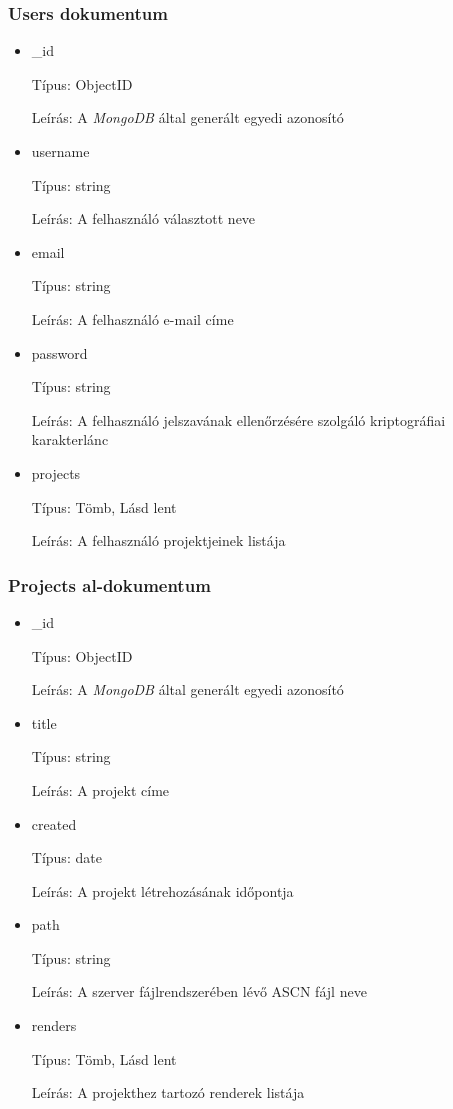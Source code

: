 \subsubsection{Users dokumentum}
\begin{itemize}
    \item \_id

          Típus: ObjectID

          Leírás: A \emph{MongoDB} által generált egyedi azonosító
    \item username

          Típus: string

          Leírás: A felhasználó választott neve
    \item email

          Típus: string

          Leírás: A felhasználó e-mail címe
    \item password

          Típus: string

          Leírás: A felhasználó jelszavának ellenőrzésére szolgáló kriptográfiai karakterlánc
    \item projects

          Típus: Tömb, Lásd lent

          Leírás: A felhasználó projektjeinek listája
\end{itemize}

\subsubsection{Projects al-dokumentum}

\begin{itemize}
    \item \_id

          Típus: ObjectID

          Leírás: A \emph{MongoDB} által generált egyedi azonosító
    \item title

          Típus: string

          Leírás: A projekt címe
    \item created

          Típus: date

          Leírás: A projekt létrehozásának időpontja
    \item path

          Típus: string

          Leírás: A szerver fájlrendszerében lévő ASCN fájl neve
    \item renders

          Típus: Tömb, Lásd lent

          Leírás: A projekthez tartozó renderek listája
\end{itemize}

